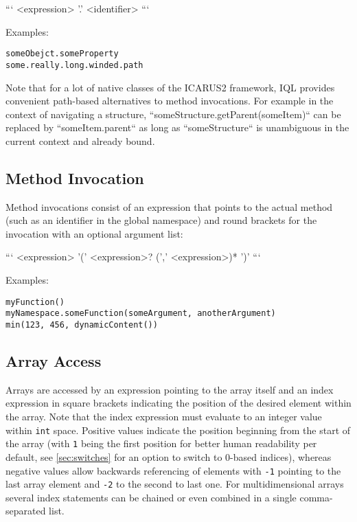 \documentclass[11pt]{article}
\begin{document}
```
<expression> '.' <identifier>
```

Examples:

\begin{verbatim}
someObejct.someProperty
some.really.long.winded.path
\end{verbatim}

Note that for a lot of native classes of the ICARUS2 framework, IQL provides convenient path-based alternatives to method invocations. For example in  the context of navigating a structure, ``someStructure.getParent(someItem)`` can be replaced by ``someItem.parent`` as long as ``someStructure`` is unambiguous in the current context and already bound.

\subsection{Method Invocation}
\label{sec:method-invocations}

Method invocations consist of an expression that points to the actual method (such as an identifier in the global namespace) and round brackets for the invocation with an optional argument list:

```
<expression> '(' <expression>? (',' <expression>)* ')'
```

Examples:

\begin{verbatim}
myFunction()
myNamespace.someFunction(someArgument, anotherArgument)
min(123, 456, dynamicContent())
\end{verbatim}

\subsection{Array Access}
\label{sec:array-access}

Arrays are accessed by an expression pointing to the array itself and an index expression in square brackets indicating the position of the desired element within the array. Note that the index expression must evaluate to an integer value within \texttt{int} space. Positive values indicate the position beginning from the start of the array (with \texttt{1} being the first position for better human readability per default, see \cref{sec:switches} for an option to switch to 0-based indices), whereas negative values allow backwards referencing of elements with \texttt{-1} pointing to the last array element and \texttt{-2} to the second to last one. For multidimensional arrays several index statements can be chained or even combined in a single comma-separated list.
\end{document}
